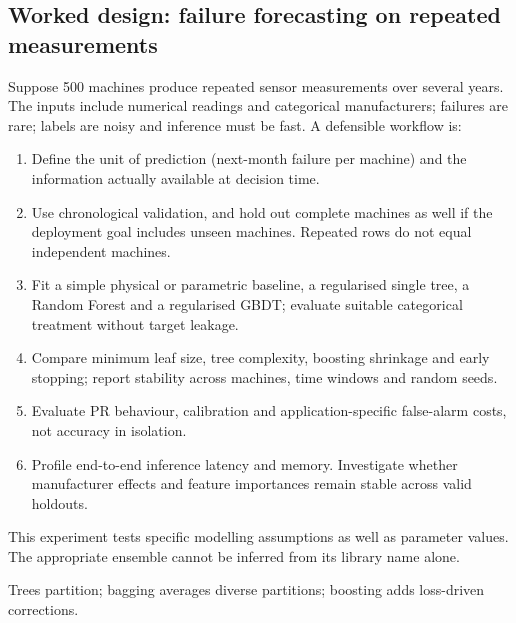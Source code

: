 \subsection{Worked design: failure forecasting on repeated measurements}
\label{subsec:trees-worked-design-failure-forecasting-on-repeated-measurements}
Suppose 500 machines produce repeated sensor measurements over several years.
The inputs include numerical readings and categorical manufacturers; failures are rare; labels are noisy and inference must be fast.
A defensible workflow is:
\begin{enumerate}
\item Define the unit of prediction (next-month failure per machine) and the information actually available at decision time.
\item Use chronological validation, and hold out complete machines as well if the deployment goal includes unseen machines.
Repeated rows do not equal independent machines.
\item Fit a simple physical or parametric baseline, a regularised single tree, a Random Forest and a regularised GBDT; evaluate suitable categorical treatment without target leakage.
\item Compare minimum leaf size, tree complexity, boosting shrinkage and early stopping; report stability across machines, time windows and random seeds.
\item Evaluate PR behaviour, calibration and application-specific false-alarm costs, not accuracy in isolation.
\item Profile end-to-end inference latency and memory.
Investigate whether manufacturer effects and feature importances remain stable across valid holdouts.
\end{enumerate}
This experiment tests specific modelling assumptions as well as parameter values.
The appropriate ensemble cannot be inferred from its library name alone.

\begin{calloutmemoryhook}
Trees partition; bagging averages diverse partitions; boosting adds loss-driven corrections.
\end{calloutmemoryhook}

